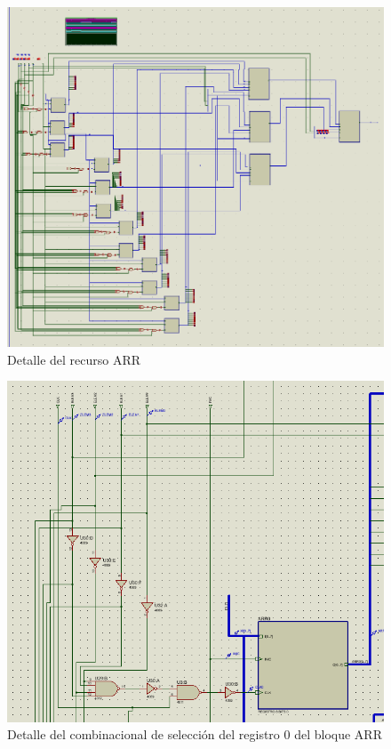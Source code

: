 \documentclass[12pt,a4paper,oneside]{article}
\begin{document}
\begin{figure}[H]
    \includegraphics[width = \textwidth]{proteus-img/arr.PNG}
    \caption{Detalle del recurso ARR}
\end{figure}

\begin{figure}[H]
    \includegraphics[width = \textwidth]{proteus-img/arr-selec-0.PNG}
    \caption{Detalle del combinacional de selección del registro 0 del bloque ARR}
\end{figure}
\end{document}
